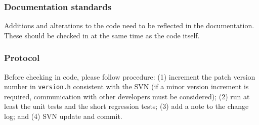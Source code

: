 \subsubsection{Documentation standards}

Additions and alterations to the code need to be reflected in the
documentation. These should be checked in at the same time as the
code itself.

\subsubsection{Protocol}

Before checking in code, please follow procedure: (1) increment the
patch version number in \texttt{version.h} consistent with the SVN
(if a minor version increment is required, communication with
other developers must be considered); (2) run at least the unit
tests and the short regression tests; (3) add a note to the change
log; and (4) SVN update and commit.

\vfill
\pagebreak

